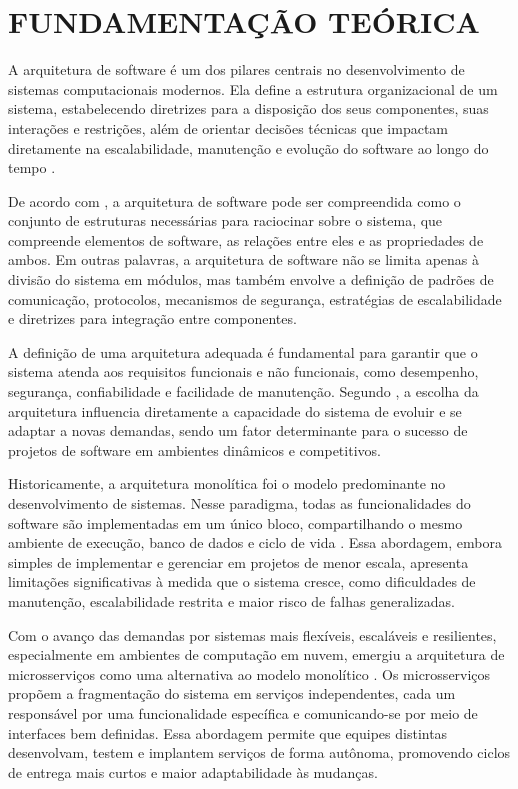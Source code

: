 \chapter{FUNDAMENTAÇÃO TEÓRICA} \label{cap:Fundamentacao}
A arquitetura de software é um dos pilares centrais no desenvolvimento de sistemas computacionais modernos. Ela define a estrutura organizacional de um sistema, estabelecendo diretrizes para a disposição dos seus componentes, suas interações e restrições, além de orientar decisões técnicas que impactam diretamente na escalabilidade, manutenção e evolução do software ao longo do tempo \cite{jamshidi2016systematic}.

De acordo com \cite{jamshidi2016systematic}, a arquitetura de software pode ser compreendida como o conjunto de estruturas necessárias para raciocinar sobre o sistema, que compreende elementos de software, as relações entre eles e as propriedades de ambos. Em outras palavras, a arquitetura de software não se limita apenas à divisão do sistema em módulos, mas também envolve a definição de padrões de comunicação, protocolos, mecanismos de segurança, estratégias de escalabilidade e diretrizes para integração entre componentes. 

A definição de uma arquitetura adequada é fundamental para garantir que o sistema atenda aos requisitos funcionais e não funcionais, como desempenho, segurança, confiabilidade e facilidade de manutenção. Segundo \cite{nizami2020comparison}, a escolha da arquitetura influencia diretamente a capacidade do sistema de evoluir e se adaptar a novas demandas, sendo um fator determinante para o sucesso de projetos de software em ambientes dinâmicos e competitivos.

Historicamente, a arquitetura monolítica foi o modelo predominante no desenvolvimento de sistemas. Nesse paradigma, todas as funcionalidades do software são implementadas em um único bloco, compartilhando o mesmo ambiente de execução, banco de dados e ciclo de vida \cite{nizami2020comparison}. Essa abordagem, embora simples de implementar e gerenciar em projetos de menor escala, apresenta limitações significativas à medida que o sistema cresce, como dificuldades de manutenção, escalabilidade restrita e maior risco de falhas generalizadas. 

Com o avanço das demandas por sistemas mais flexíveis, escaláveis e resilientes, especialmente em ambientes de computação em nuvem, emergiu a arquitetura de microsserviços como uma alternativa ao modelo monolítico \cite{jamshidi2016systematic, shekhar2023microservices}. Os microsserviços propõem a fragmentação do sistema em serviços independentes, cada um responsável por uma funcionalidade específica e comunicando-se por meio de interfaces bem definidas. Essa abordagem permite que equipes distintas desenvolvam, testem e implantem serviços de forma autônoma, promovendo ciclos de entrega mais curtos e maior adaptabilidade às mudanças. 

